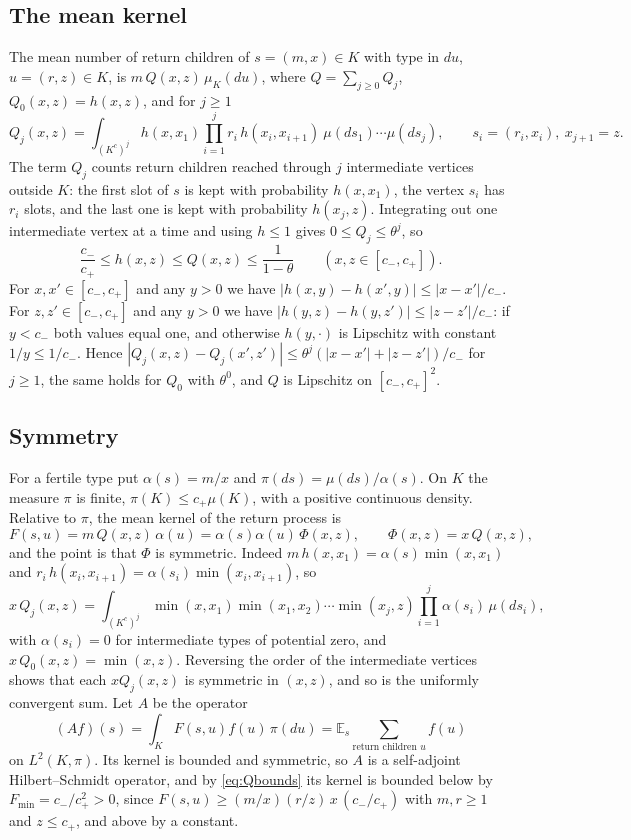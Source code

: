 \documentclass[11pt]{amsart}
\theoremstyle{remark}
\numberwithin{equation}{section}
\newcommand{\E}{\mathbb E}
\newcommand{\1}{\mathbf 1}
\begin{document}
\subsection{The mean kernel}
The mean number of return children of $s=(m,x)\in K$ with type in $du$, $u=(r,z)\in K$, is $m\,Q(x,z)\,\mu_K(du)$, where $Q=\sum_{j\ge0}Q_j$, $Q_0(x,z)=h(x,z)$, and for $j\ge1$
\[
Q_j(x,z)=\int_{(K^c)^j}h(x,x_1)\prod_{i=1}^{j}r_i\,h(x_i,x_{i+1})\ \mu(ds_1)\cdots\mu(ds_j),\qquad s_i=(r_i,x_i),\ x_{j+1}=z .
\]
The term $Q_j$ counts return children reached through $j$ intermediate vertices outside $K$: the first slot of $s$ is kept with probability $h(x,x_1)$, the vertex $s_i$ has $r_i$ slots, and the last one is kept with probability $h(x_j,z)$. Integrating out one intermediate vertex at a time and using $h\le1$ gives $0\le Q_j\le\theta^j$, so
\begin{equation}\label{eq:Qbounds}
\frac{c_-}{c_+}\le h(x,z)\le Q(x,z)\le\frac1{1-\theta}\qquad(x,z\in[c_-,c_+]).
\end{equation}
For $x,x'\in[c_-,c_+]$ and any $y>0$ we have $|h(x,y)-h(x',y)|\le|x-x'|/c_-$. For $z,z'\in[c_-,c_+]$ and any $y>0$ we have $|h(y,z)-h(y,z')|\le|z-z'|/c_-$: if $y<c_-$ both values equal one, and otherwise $h(y,\cdot)$ is Lipschitz with constant $1/y\le1/c_-$. Hence $|Q_j(x,z)-Q_j(x',z')|\le\theta^{j}(|x-x'|+|z-z'|)/c_-$ for $j\ge1$, the same holds for $Q_0$ with $\theta^0$, and $Q$ is Lipschitz on $[c_-,c_+]^2$.

\subsection{Symmetry}
For a fertile type put $\alpha(s)=m/x$ and $\pi(ds)=\mu(ds)/\alpha(s)$. On $K$ the measure $\pi$ is finite, $\pi(K)\le c_+\mu(K)$, with a positive continuous density. Relative to $\pi$, the mean kernel of the return process is
\[
F(s,u)=m\,Q(x,z)\,\alpha(u)=\alpha(s)\alpha(u)\,\Phi(x,z),\qquad \Phi(x,z)=x\,Q(x,z),
\]
and the point is that $\Phi$ is symmetric. Indeed $m\,h(x,x_1)=\alpha(s)\min(x,x_1)$ and $r_i\,h(x_i,x_{i+1})=\alpha(s_i)\min(x_i,x_{i+1})$, so
\[
x\,Q_j(x,z)=\int_{(K^c)^j}\min(x,x_1)\min(x_1,x_2)\cdots\min(x_j,z)\prod_{i=1}^j\alpha(s_i)\,\mu(ds_i),
\]
with $\alpha(s_i)=0$ for intermediate types of potential zero, and $x\,Q_0(x,z)=\min(x,z)$. Reversing the order of the intermediate vertices shows that each $xQ_j(x,z)$ is symmetric in $(x,z)$, and so is the uniformly convergent sum. Let $A$ be the operator
\[
(Af)(s)=\int_KF(s,u)f(u)\,\pi(du)=\E_s\sum_{\text{return children }u}f(u)
\]
on $L^2(K,\pi)$. Its kernel is bounded and symmetric, so $A$ is a self-adjoint Hilbert--Schmidt operator, and by \eqref{eq:Qbounds} its kernel is bounded below by $F_{\min}=c_-/c_+^2>0$, since $F(s,u)\ge(m/x)(r/z)\,x\,(c_-/c_+)$ with $m,r\ge1$ and $z\le c_+$, and above by a constant.
\end{document}
